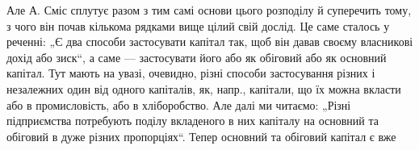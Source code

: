 Але А. Сміс сплутує разом з тим самі основи цього розподілу й суперечить
тому, з чого він почав кількома рядками вище цілий свій
дослід. Це саме сталось у реченні: „Є два способи застосувати капітал
так, щоб він давав своєму власникові дохід або зиск“, а саме — застосувати
його або як обіговий або як основний капітал. Тут мають на увазі,
очевидно, різні способи застосування різних і незалежних один від одного
капіталів, як, напр., капітали, що їх можна вкласти або в промисловість,
або в хліборобство. Але далі ми читаємо: „Різні підприємства
потребують поділу вкладеного в них капіталу на основний та обіговий
в дуже різних пропорціях“. Тепер основний та обіговий капітал є вже
\parbreak{}  %
